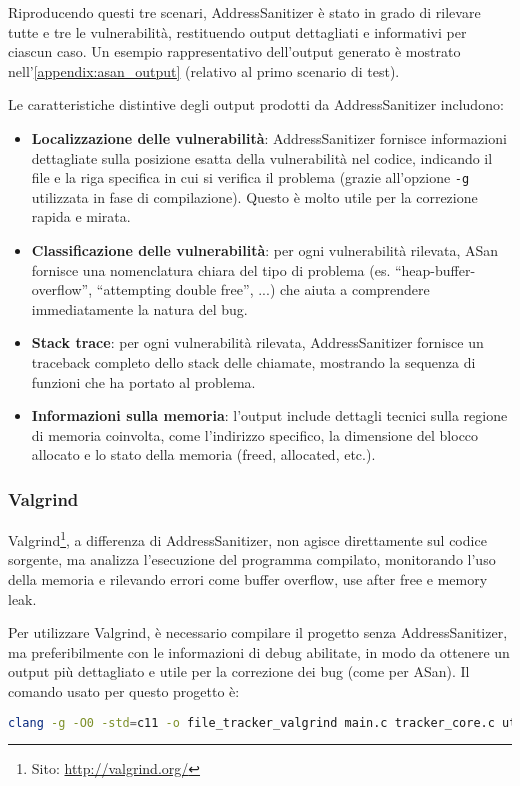 Riproducendo questi tre scenari, AddressSanitizer è stato in grado di rilevare tutte
e tre le vulnerabilità, restituendo output dettagliati e informativi per ciascun
caso. Un esempio rappresentativo dell'output generato è mostrato nell'\autoref{appendix:asan_output}
(relativo al primo scenario di test).

Le caratteristiche distintive degli output prodotti da AddressSanitizer includono:
\begin{itemize}
  \item \textbf{Localizzazione delle vulnerabilità}: AddressSanitizer fornisce informazioni
    dettagliate sulla posizione esatta della vulnerabilità nel codice, indicando
    il file e la riga specifica in cui si verifica il problema (grazie all'opzione
    \texttt{-g} utilizzata in fase di compilazione). Questo è molto utile per la
    correzione rapida e mirata.

  \item \textbf{Classificazione delle vulnerabilità}: per ogni vulnerabilità rilevata,
    ASan fornisce una nomenclatura chiara del tipo di problema (es. ``heap-buffer-overflow'',
    ``attempting double free'', ...) che aiuta a comprendere immediatamente la natura
    del bug.

  \item \textbf{Stack trace}: per ogni vulnerabilità rilevata, AddressSanitizer
    fornisce un traceback completo dello stack delle chiamate, mostrando la sequenza
    di funzioni che ha portato al problema.

  \item \textbf{Informazioni sulla memoria}: l'output include dettagli tecnici sulla
    regione di memoria coinvolta, come l'indirizzo specifico, la dimensione del blocco
    allocato e lo stato della memoria (freed, allocated, etc.).
\end{itemize}

\subsubsection*{Valgrind}
Valgrind\footnote{Sito: \url{http://valgrind.org/}}, a differenza di AddressSanitizer,
non agisce direttamente sul codice sorgente, ma analizza l'esecuzione del programma
compilato, monitorando l'uso della memoria e rilevando errori come buffer
overflow, use after free e memory leak.

Per utilizzare Valgrind, è necessario compilare il progetto senza
AddressSanitizer, ma preferibilmente con le informazioni di debug abilitate, in
modo da ottenere un output più dettagliato e utile per la correzione dei bug (come
per ASan). Il comando usato per questo progetto è:
\begin{lstlisting}[language=bash, numbers=none]
clang -g -O0 -std=c11 -o file_tracker_valgrind main.c tracker_core.c utils.c
\end{lstlisting}

